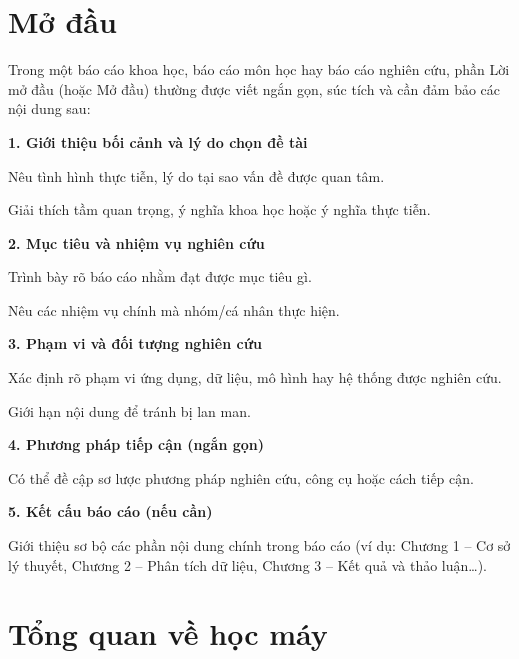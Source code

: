 \documentclass[12pt,a4paper,oneside]{report}
\newcommand{\unnumberedchapter}[1]{%
  \chapter*{#1}\addcontentsline{toc}{chapter}{#1}}
\begin{document}
\tableofcontents
\clearpage
{}
\listoffigures
\clearpage
{}
\listoftables
\clearpage

\unnumberedchapter{Mở đầu}

Trong một báo cáo khoa học, báo cáo môn học hay báo cáo nghiên cứu, phần
Lời mở đầu (hoặc Mở đầu) thường được viết ngắn gọn, súc tích và cần đảm
bảo các nội dung sau:

\textbf{1. Giới thiệu bối cảnh và lý do chọn đề tài}

Nêu tình hình thực tiễn, lý do tại sao vấn đề được quan tâm.

Giải thích tầm quan trọng, ý nghĩa khoa học hoặc ý nghĩa thực tiễn.

\textbf{2. Mục tiêu và nhiệm vụ nghiên cứu}

Trình bày rõ báo cáo nhằm đạt được mục tiêu gì.

Nêu các nhiệm vụ chính mà nhóm/cá nhân thực hiện.

\textbf{3. Phạm vi và đối tượng nghiên cứu}

Xác định rõ phạm vi ứng dụng, dữ liệu, mô hình hay hệ thống được nghiên cứu.

Giới hạn nội dung để tránh bị lan man.

\textbf{4. Phương pháp tiếp cận (ngắn gọn)}

Có thể đề cập sơ lược phương pháp nghiên cứu, công cụ hoặc cách tiếp cận.

\textbf{5. Kết cấu báo cáo (nếu cần)}

Giới thiệu sơ bộ các phần nội dung chính trong báo cáo (ví dụ: Chương 1
-- Cơ sở lý thuyết, Chương 2 -- Phân tích dữ liệu, Chương 3 -- Kết quả
và thảo luận\dots).

\chapter{Tổng quan về học máy}
\end{document}
